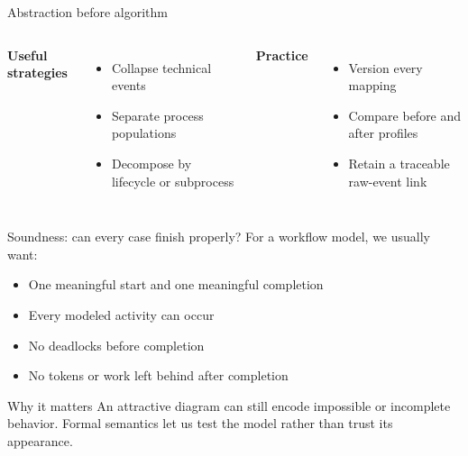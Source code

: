 \documentclass[aspectratio=169,11pt]{beamer}
\begin{document}
\begin{frame}{Abstraction before algorithm}
  \centering
  \vspace{0.55cm}
  \begin{columns}[T,onlytextwidth]
      \textbf{Useful strategies}
      \begin{itemize}
        \item Collapse technical events
        \item Separate process populations
        \item Decompose by lifecycle or subprocess
      \end{itemize}
      \textbf{Practice}
      \begin{itemize}
        \item Version every mapping
        \item Compare before and after profiles
        \item Retain a traceable raw-event link
      \end{itemize}
  \end{columns}
\end{frame}

\begin{frame}{Soundness: can every case finish properly?}
  For a workflow model, we usually want:
  \begin{itemize}
    \item One meaningful start and one meaningful completion
    \item Every modeled activity can occur
    \item No deadlocks before completion
    \item No tokens or work left behind after completion
  \end{itemize}
  \vspace{0.35cm}
  \begin{block}{Why it matters}
    An attractive diagram can still encode impossible or incomplete behavior.
    Formal semantics let us test the model rather than trust its appearance.
  \end{block}
\end{frame}
\end{document}
